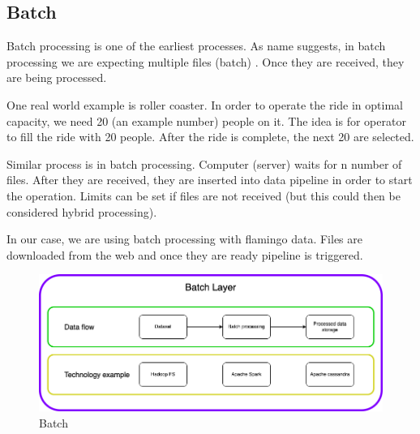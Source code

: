 \subsection{Batch}\label{Batch}

Batch processing is one of the earliest processes. As name suggests, in batch processing we are expecting multiple files (batch) \parencite{web:Amazon}. Once they are received, they are being processed.

One real world example is roller coaster. In order to operate the ride in optimal capacity, we need 20 (an example number) people on it. The idea is for operator to fill the ride with 20 people. After the ride is complete, the next 20 are selected.

Similar process is in batch processing. Computer (server) waits for n number of files. After they are received, they are inserted into data pipeline in order to start the operation. Limits can be set if files are not received (but this could then be considered hybrid processing).

In our case, we are using batch processing with flamingo data. Files are downloaded from the web and once they are ready pipeline is triggered.


\begin{figure}[H]
\includegraphics[scale=0.45]{img/ProcessingParadigms/BigData-Batch.png}
\centering
\caption{Batch}
\label{fig:Batch}
\end{figure}